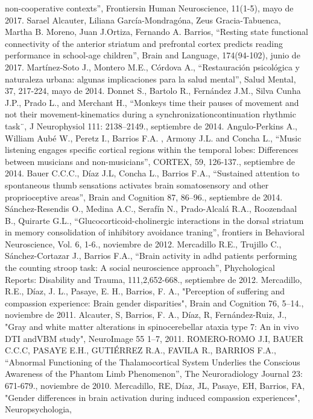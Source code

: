 non-cooperative contexts”, Frontiersin Human Neuroscience, 11(1-5),  mayo de 2017.
Sarael Alcauter, Liliana García-Mondragóna, Zeus Gracia-Tabuenca, Martha B. Moreno, Juan J.Ortiza, Fernando A. Barrios, “Resting state functional 
connectivity of the anterior striatum and prefrontal cortex predicts reading performance in school-age children”, Brain and Language, 174(94-102),  junio de 
2017.
Martínez-Soto J., Montero M.E., Córdova A., “Restauración psicológica y naturaleza urbana: algunas implicaciones para la salud mental”, Salud Mental, 37, 
217-224,  mayo de 2014.
Donnet S., Bartolo R., Fernández J.M., Silva Cunha J.P., Prado L., and Merchant H., “Monkeys time their pauses of movement and not their movement-kinematics 
during a synchronizationcontinuation rhythmic task¨, J Neurophysiol 111: 2138–2149.,  septiembre de 2014.
Angulo-Perkins A., William Aubé W., Peretz I., Barrios F.A. , Armony J.L. and Concha L., “Music listening engages specific cortical regions within the 
temporal lobes: Differences between musicians and non-musicians”, CORTEX, 59, 126-137.,  septiembre de 2014.
Bauer C.C.C., Díaz J.L, Concha L., Barrios F.A., “Sustained attention to spontaneous thumb sensations activates brain somatosensory and other proprioceptive 
areas”, Brain and Cognition 87, 86–96.,  septiembre de 2014.
Sánchez-Resendis O., Medina A.C., Serafín N., Prado-Alcalá R.A., Roozendaal B., Quirarte G.L., “Glucocorticoid-cholinergic interactions in the dorsal 
striatum in memory consolidation of inhibitory avoidance traning”, frontiers in Behavioral Neuroscience, Vol. 6, 1-6.,  noviembre de 2012.
Mercadillo R.E., Trujillo C., Sánchez-Cortazar J., Barrios F.A., “Brain activity in adhd patients performing the counting stroop task: A social neuroscience 
approach”, Phychological Reports: Disability and Trauma, 111,2,652-668.,  septiembre de 2012.
Mercadillo, R.E., Díaz, J. L., Pasaye, E. H., Barrios, F. A., "Perception of suffering and compassion experience: Brain gender disparities", Brain and 
Cognition 76, 5–14.,  noviembre de 2011.
Alcauter, S, Barrios, F. A., Díaz, R, Fernández-Ruiz, J., "Gray and white matter alterations in spinocerebellar ataxia type 7: An in vivo DTI andVBM study", 
NeuroImage 55 1–7,  2011.
ROMERO-ROMO J.I, BAUER C.C.C, PASAYE E.H., GUTIÉRREZ R.A., FAVILA R., BARRIOS F.A., “Abnormal Functioning of the Thalamocortical System Underlies the 
Conscious Awareness of the Phantom Limb Phenomenon”, The Neuroradiology Journal 23: 671-679.,  noviembre de 2010.
Mercadillo, RE, Díaz, JL, Pasaye, EH, Barrios, FA, "Gender differences in brain activation during induced compassion experiences", Neuropsychologia, 
